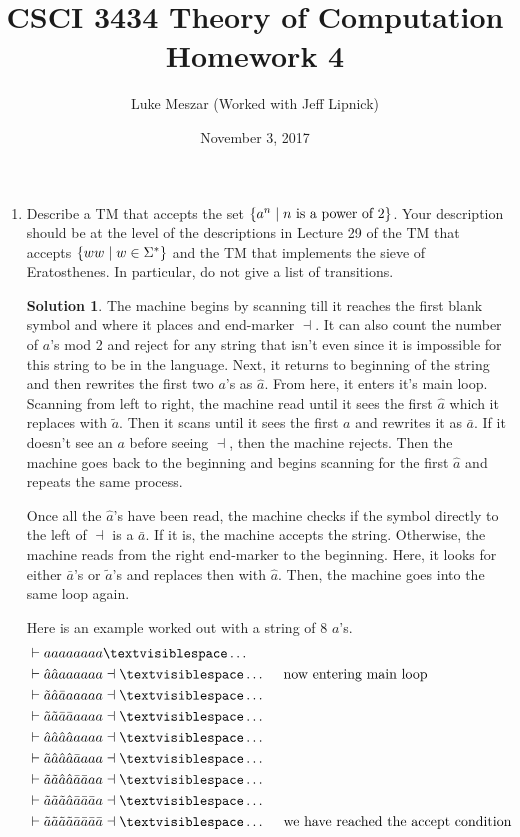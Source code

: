 \documentclass{article}
\title{CSCI 3434 Theory of Computation Homework 4}
\author{Luke Meszar (Worked with Jeff Lipnick)}
\date{November 3, 2017}
\newcommand{\setst}{\hspace{1mm} | \hspace{1mm} }
\theoremstyle{definition}
\newtheorem*{solution*}{Solution}
\begin{document}
\maketitle
\begin{enumerate}
	\item[HW 8.1] Describe a TM that accepts the set $\{a^n \setst n \text{ is a power of } 2\}$. Your
	description should be at the level of the descriptions in Lecture 29 of the TM that accepts $\{ww  \setst w \in \Sigma^*\}$ and the TM that implements the
	sieve of Eratosthenes. In particular, do not give a list of transitions.
	\begin{solution*}
		The machine begins by scanning till it reaches the first blank symbol and where it places and end-marker $\dashv$. It can also count the number of $a$'s mod 2 and reject for any string that isn't even since it is impossible for this string to be in the language. Next, it returns to beginning of the string and then rewrites the first two $a$'s as $\hat{a}$. From here, it enters it's main loop. Scanning from left to right, the machine read until it sees the first $\hat{a}$ which it replaces with $\tilde{a}$. Then it scans until it sees the first $a$ and rewrites it as $\bar{a}$. If it doesn't see an $a$ before seeing $\dashv$, then the machine rejects. Then the machine goes back to the beginning and begins scanning for the first $\hat{a}$ and repeats the same process.
		
		 Once all the $\hat{a}$'s have been read, the machine checks if the symbol directly to the left of $\dashv$ is a $\bar{a}$. If it is, the machine accepts the string. Otherwise, the machine reads from the right end-marker to the beginning. Here, it looks for either $\bar{a}$'s or $\tilde{a}$'s and replaces then with $\hat{a}$. Then, the machine goes into the same loop again.   
		 
		 Here is an example worked out with a string of 8 $a$'s.
		 \begin{align*}
		 &\vdash aaaaaaaa \textvisiblespace\ldots\\
		 &\vdash \hat{a}\hat{a}aaaaaa\dashv \textvisiblespace\ldots\quad\text{ now entering main loop}\\ 
		 &\vdash \tilde{a}\hat{a}\bar{a}aaaaa\dashv \textvisiblespace\ldots\\
		 &\vdash \tilde{a}\tilde{a}\bar{a}\bar{a}aaaa\dashv \textvisiblespace\ldots\\
		 &\vdash \hat{a}\hat{a}\hat{a}\hat{a}aaaa\dashv \textvisiblespace\ldots\\
		 &\vdash \tilde{a}\hat{a}\hat{a}\hat{a}\bar{a}aaa\dashv \textvisiblespace\ldots\\
		 &\vdash \tilde{a}\tilde{a}\hat{a}\hat{a}\bar{a}\bar{a}aa\dashv \textvisiblespace\ldots\\
		 &\vdash \tilde{a}\tilde{a}\tilde{a}\hat{a}\bar{a}\bar{a}\bar{a}a\dashv \textvisiblespace\ldots\\
		 &\vdash \tilde{a}\tilde{a}\tilde{a}\tilde{a}\bar{a}\bar{a}\bar{a}\bar{a}\dashv \textvisiblespace\ldots\quad\text{ we have reached the accept condition}\\
		 \end{align*}
		 

\end{solution*}
\end{enumerate}
\end{document}
